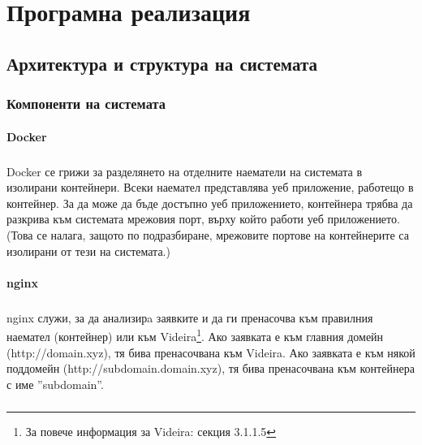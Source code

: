 \documentclass[pdftex,14pt,a4paper]{extreport}
\begin{document}
\chapter {Програмна реализация}
\section {Архитектура и структура на системата}
\subsection {Компоненти на системата}
\subsubsection {Docker}
\paragraph {}
Docker се грижи за разделянето на отделните наематели на системата в изолирани контейнери. Всеки наемател представлява уеб приложение, работещо в контейнер. За да може да бъде достъпно уеб приложението, контейнера трябва да разкрива към системата мрежовия порт, върху който работи уеб приложението. (Това се налага, защото по подразбиране, мрежовите портове на контейнерите са изолирани от тези на системата.)
\subsubsection {nginx}
\paragraph {}
nginx служи, за да анализирa заявките и да ги пренасочва към правилния наемател (контейнер) или към Videira\footnote{За повече информация за Videira: секция 3.1.1.5}. Ако заявката е към главния домейн (http://domain.xyz), тя бива пренасочвана към Videira. Ако заявката е към някой поддомейн (http://subdomain.domain.xyz), тя бива пренасочвана към контейнера с име ''subdomain''.
\paragraph {}
\end{document}
